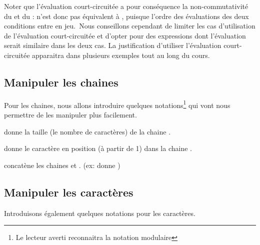 			Noter que l’évaluation court-circuitée a pour conséquence la
			non-commutativité du  et du
			:  n’est donc
			pas équivalent à , puisque l’ordre
			des évaluations des deux conditions entre en jeu.~Nous conseillons
			cependant de limiter les cas d’utilisation de l’évaluation
			court-circuitée et d'opter pour des expressions dont
			l’évaluation serait similaire dans les deux cas. La justification
			d’utiliser l’évaluation court-circuitée apparaitra dans plusieurs
			exemples tout au long du cours.
	
		\subsection{Manipuler les chaines}
		
			Pour les chaines, nous allons introduire quelques notations\footnote{
			Le lecteur averti reconnaitra la notation modulaire}
			qui vont nous permettre de les manipuler plus facilement.
		
			\begin{liste}
			\item {}
				donne la taille (le nombre de caractères) de la chaine 
				.
			\item {}
				donne le caractère en position  
				(à partir de 1) dans la chaine .
			\item {}
				concatène les chaines  
				et .
				(ex:  donne )
			\end{liste}

		\subsection{Manipuler les caractères}

			Introduisons également quelques notations pour les caractères.

